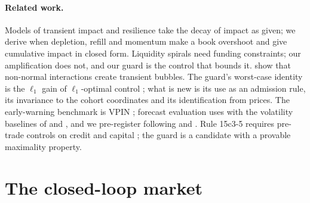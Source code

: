     \paragraph{Related work.} Models of transient impact and resilience \citep{p2:obizhaeva2013,p2:bouchaud2004,p2:bouchaud2018} take the decay of impact as given; we derive when depletion, refill and momentum make a book overshoot and give cumulative impact in closed form. Liquidity spirals \citep{p2:brunnermeier2009,p2:shleifer1992} need funding constraints; our amplification does not, and our guard is the control that bounds it. \citet{p2:sornette2023} show that non-normal interactions create transient bubbles. The guard's worst-case identity is the $\ell_1$ gain of $\ell_1$-optimal control \citep{p2:vidyasagar1986,p2:dahleh1987,p2:dahleh1995}; what is new is its use as an admission rule, its invariance to the cohort coordinates and its identification from prices. The early-warning benchmark is VPIN \citep{p2:easley2012,p2:andersen2014}; forecast evaluation uses \citet{p2:clark2007} with the volatility baselines of \citet{p2:corsi2009} and \citet{p2:riskmetrics1996}, and we pre-register following \citet{p2:nosek2018} and \citet{p2:harvey2017}. Rule 15c3-5 requires pre-trade controls on credit and capital \citep{p2:sec2010}; the guard is a candidate with a provable maximality property.

    \section{The closed-loop market}\label{p2:sec:model}

